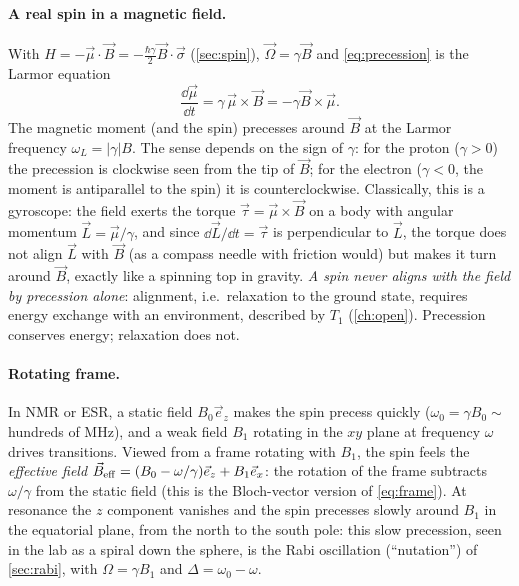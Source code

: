 \paragraph{A real spin in a magnetic field.} With $H=-\vec\mu\cdot\vec B=-\frac{\hbar\gamma}2\vec B\cdot\vec\sigma$ (\cref{sec:spin}), $\vec\Omega=\gamma\vec B$ and
\cref{eq:precession} is the Larmor equation
\begin{equation}
  \frac{\dd\vec\mu}{\dd t}=\gamma\,\vec\mu\times\vec B=-\gamma\vec B\times\vec\mu .
\end{equation}
The magnetic moment (and the spin) precesses around $\vec B$ at the Larmor frequency $\omega_L=|\gamma|B$. The sense depends on the sign of $\gamma$: for the proton
($\gamma>0$) the precession is clockwise seen from the tip of $\vec B$; for the electron ($\gamma<0$, the moment is antiparallel to the spin) it is counterclockwise.
Classically, this is a gyroscope: the field exerts the torque $\vec\tau=\vec\mu\times\vec B$ on a body with angular momentum $\vec L=\vec\mu/\gamma$, and since $\dd\vec L/\dd t=\vec\tau$
is perpendicular to $\vec L$, the torque does not align $\vec L$ with $\vec B$ (as a compass needle with friction would) but makes it turn around $\vec B$, exactly like a spinning
top in gravity. \emph{A spin never aligns with the field by precession alone}: alignment, i.e.\ relaxation to the ground state, requires energy exchange with an environment,
described by $T_1$ (\cref{ch:open}). Precession conserves energy; relaxation does not.

\paragraph{Rotating frame.} In NMR or ESR, a static field $B_0\vec e_z$ makes the spin precess quickly ($\omega_0=\gamma B_0\sim$ hundreds of MHz), and a weak field $B_1$
rotating in the $xy$ plane at frequency $\omega$ drives transitions. Viewed from a frame rotating with $B_1$, the spin feels the \emph{effective field}
$\vec B_{\rm eff}=(B_0-\omega/\gamma)\vec e_z+B_1\vec e_x$: the rotation of the frame subtracts $\omega/\gamma$ from the static field (this is the Bloch-vector version of
\cref{eq:frame}). At resonance the $z$ component vanishes and the spin precesses slowly around $B_1$ in the equatorial plane, from the north to the south pole: this slow
precession, seen in the lab as a spiral down the sphere, is the Rabi oscillation (``nutation'') of \cref{sec:rabi}, with $\Omega=\gamma B_1$ and $\Delta=\omega_0-\omega$.

